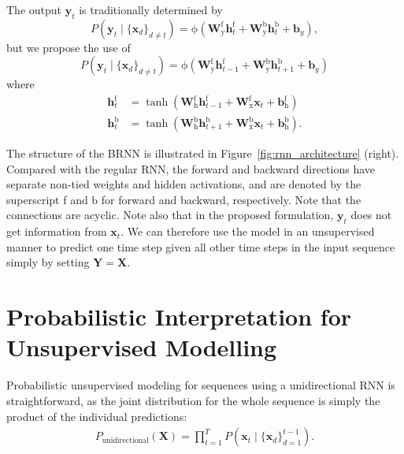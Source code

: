 \documentclass{article}
\begin{document}
The output $\mathbf{y}_t$ is traditionally determined by
\begin{equation*}
P\left(\mathbf{y}_t \mid \{\mathbf{x}_d\}_{d\neq t}\right) = \mathrm{\phi} 
\left( \mathbf{W}_\mathrm{y}^\mathrm{f} 
\mathbf{h}_{t}^\mathrm{f} + \mathbf{W}_\mathrm{y}^\mathrm{b} 
\mathbf{h}_{t}^\mathrm{b} + \mathbf{b}_y \right), 
\end{equation*}
but we propose the use of
\begin{equation}
P\left(\mathbf{y}_t \mid \{\mathbf{x}_d\}_{d\neq t}\right) = \mathrm{\phi} 
\left( \mathbf{W}_\mathrm{y}^\mathrm{f} 
\mathbf{h}_{t-1}^\mathrm{f} + \mathbf{W}_\mathrm{y}^\mathrm{b} 
\mathbf{h}_{t+1}^\mathrm{b} + \mathbf{b}_y \right)
\label{eq:bi_y}
\end{equation}
where
\begin{align}
\mathbf{h}_t^\mathrm{f} &= \tanh \left( \mathbf{W}_\mathrm{h}^\mathrm{f} 
\mathbf{h}^\mathrm{f} _{t-1} + \mathbf{W}_\mathrm{x}^\mathrm{f} \mathbf{x}_{t} + 
\mathbf{b}_\mathrm{h}^\mathrm{f} \right)
\label{eq:bi_hf}
\\
\mathbf{h}_t^\mathrm{b} &= \tanh \left( \mathbf{W}_\mathrm{h}^\mathrm{b} 
\mathbf{h}^\mathrm{b}_{t+1} + \mathbf{W}_\mathrm{x}^\mathrm{b} \mathbf{x}_{t} 
+ \mathbf{b}_\mathrm{h}^\mathrm{b} \right).
\label{eq:bi_hb}
\end{align}

The structure of the BRNN is illustrated in Figure~\ref{fig:rnn_architecture} (right). 
Compared with the regular RNN, the forward and backward directions have separate
non-tied weights and hidden activations, and are denoted by the superscript f and b for 
forward and backward, respectively. 
Note that the connections are acyclic. 
Note also that in the proposed formulation, $\mathbf{y}_{t}$ does not get 
information from $\mathbf{x}_{t}$. 
We can therefore use the model in an unsupervised 
manner to predict one time step given all other time steps in the input 
sequence simply by setting $\mathbf{Y}=\mathbf{X}$. 

\section{Probabilistic Interpretation for Unsupervised Modelling}

Probabilistic unsupervised modeling for sequences using a unidirectional RNN is 
straightforward, as the joint distribution for the whole sequence is simply the 
product of the individual predictions:
\begin{align}
P_{\mathrm{unidirectional}}(\mathbf{X}) = \prod_{t=1}^T P(\mathbf{x}_t \mid \{\mathbf{x}_d\}_{d=1}^{t-1}). 
\end{align}
\end{document}
